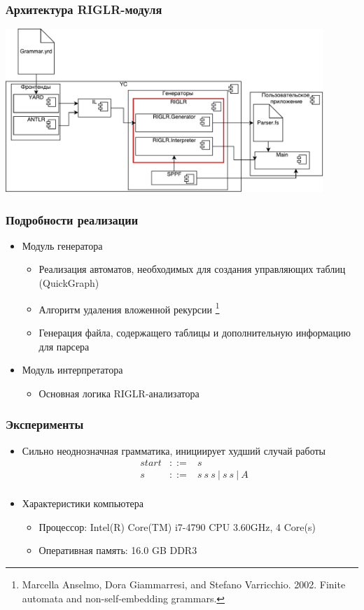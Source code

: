 \documentclass{beamer}
\begin{document}
\begin{frame}[fragile]
	\transwipe[direction=90]
	\frametitle{Архитектура RIGLR-модуля}
	\includegraphics[width=12cm]{pictures/RIGLRArch.pdf}
\end{frame}

\begin{frame}
	\transwipe[direction=90]
	\frametitle{Подробности реализации}
	\begin{itemize}
		\item Модуль генератора
		\begin{itemize}
			\item Реализация автоматов, необходимых для создания управляющих таблиц (QuickGraph)
			\item Алгоритм удаления вложенной рекурсии \footnote{Marcella Anselmo, Dora Giammarresi, and Stefano Varricchio. 2002. Finite automata and non-self-embedding grammars.}
			\item Генерация файла, содержащего таблицы и дополнительную информацию для парсера
		\end{itemize}
		\item Модуль интерпретатора
		\begin{itemize}
			\item Основная логика RIGLR-анализатора
		\end{itemize}
	\end{itemize}	
\end{frame}

\begin{frame}[fragile]
	\transwipe[direction=90]
	\frametitle{Эксперименты}
	\begin{itemize}
		\item Сильно неоднозначная грамматика, инициирует худший случай работы
		$$ 
		\begin{array}{crcl}
			&start &::=& s \\
			&s & ::= & s \ s \ s \ | \ s \ s \ | \ A\\
		\end{array} 
		$$	
		\item Характеристики компьютера
		\begin{itemize}
			\item Процессор: Intel(R) Core(TM) i7-4790 CPU 3.60GHz, 4 Core(s)
			\item Оперативная память: 16.0 GB DDR3
		\end{itemize}
	\end{itemize}
\end{frame}
\end{document}
